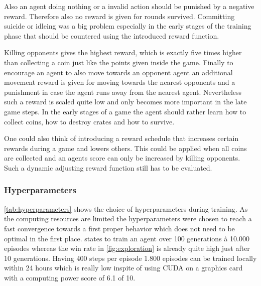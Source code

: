 Also an agent doing nothing or a invalid action should be punished by a negative reward. Therefore also no reward is given for rounds survived. Committing suicide or idleing was a big problem especially in the early stages of the training phase that should be countered using the introduced reward function. 

Killing opponents gives the highest reward, which is exactly five times higher than collecting a coin just like the points given inside the game. Finally to encourage an agent to also move towards an opponent agent an additional movement reward is given for moving towards the nearest opponents and a punishment in case the agent runs away from the nearest agent. Nevertheless such a reward is scaled quite low and only becomes more important in the late game steps. In the early stages of a game the agent should rather learn how to collect coins, how to destroy crates and how to survive. 

One could also think of introducing a reward schedule that increases certain rewards during a game and lowers others. This could be applied when all coins are collected and an agents score can only be increased by killing opponents. Such a dynamic adjusting reward function still has to be evaluated.

\subsubsection{Hyperparameters}
\label{ch:approachBe}

\autoref{tab:hyperparameters} shows the choice of hyperparameters during training. As the computing resources are limited the hyperparameters were chosen to reach a fast convergence towards a first proper behavior which does not need to be optimal in the first place. \cite{Kormelink2018} states to train an agent over 100 generations à 10.000 episodes whereas the win rate in \autoref{fig:exploration} is already quite high just after 10 generations. Having 400 steps per episode 1.800 episodes can be trained locally within 24 hours which is really low inspite of using CUDA on a graphics card with a computing power score of 6.1 of 10. 

